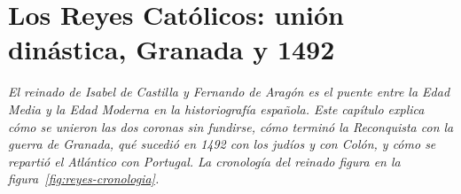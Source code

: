 \documentclass{book}
\begin{document}
\chapter{Los Reyes Católicos: unión dinástica, Granada y 1492}
\label{chap:hist-01}

\noindent\textit{El reinado de Isabel de Castilla y Fernando de Aragón es el puente entre la Edad Media y la Edad Moderna en la historiografía española. Este capítulo explica cómo se unieron las dos coronas sin fundirse, cómo terminó la Reconquista con la guerra de Granada, qué sucedió en 1492 con los judíos y con Colón, y cómo se repartió el Atlántico con Portugal. La cronología del reinado figura en la figura~\ref{fig:reyes-cronologia}.}

\end{document}
